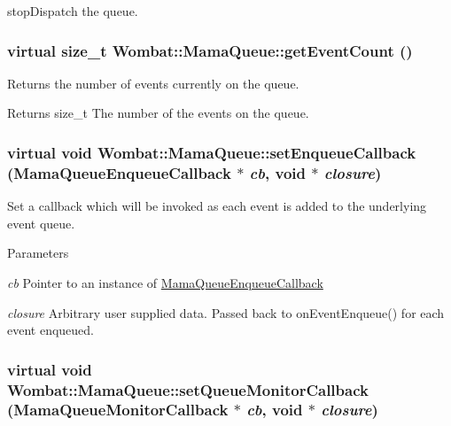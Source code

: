 stopDispatch the queue. \hypertarget{classWombat_1_1MamaQueue_adccba195eae12f648ab5afcd0db14d0c}{
\subsubsection[{getEventCount}]{\setlength{\rightskip}{0pt plus 5cm}virtual size\_\-t Wombat::MamaQueue::getEventCount ()}}
\label{classWombat_1_1MamaQueue_adccba195eae12f648ab5afcd0db14d0c}


Returns the number of events currently on the queue. \begin{DoxyReturn}{Returns}
size\_\-t The number of the events on the queue. 
\end{DoxyReturn}
\hypertarget{classWombat_1_1MamaQueue_a852c925667c07e8bd0b3bc8cf30f4986}{
\subsubsection[{setEnqueueCallback}]{\setlength{\rightskip}{0pt plus 5cm}virtual void Wombat::MamaQueue::setEnqueueCallback ({\bf MamaQueueEnqueueCallback} $\ast$ {\em cb}, \/  void $\ast$ {\em closure})}}
\label{classWombat_1_1MamaQueue_a852c925667c07e8bd0b3bc8cf30f4986}


Set a callback which will be invoked as each event is added to the underlying event queue. 
\begin{DoxyParams}{Parameters}
\item[{\em cb}]Pointer to an instance of \hyperlink{classWombat_1_1MamaQueueEnqueueCallback}{MamaQueueEnqueueCallback} \item[{\em closure}]Arbitrary user supplied data. Passed back to onEventEnqueue() for each event enqueued. \end{DoxyParams}
\hypertarget{classWombat_1_1MamaQueue_a93d4b30ff2f99b071a2d873653381569}{
\subsubsection[{setQueueMonitorCallback}]{\setlength{\rightskip}{0pt plus 5cm}virtual void Wombat::MamaQueue::setQueueMonitorCallback ({\bf MamaQueueMonitorCallback} $\ast$ {\em cb}, \/  void $\ast$ {\em closure})}}
\label{classWombat_1_1MamaQueue_a93d4b30ff2f99b071a2d873653381569}


